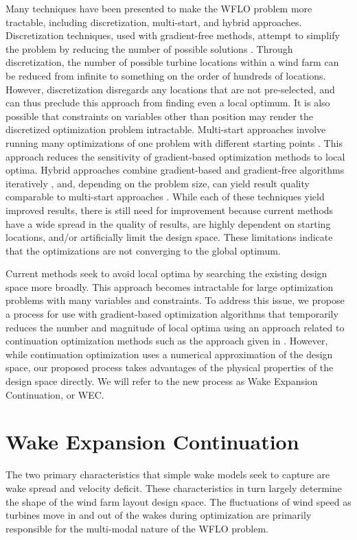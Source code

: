 \documentclass[a4paper]{jpconf}
\begin{document}
Many techniques have been presented to make the WFLO problem more tractable, including discretization, multi-start, and hybrid approaches. Discretization techniques, used with gradient-free methods, attempt to simplify the problem by reducing the number of possible solutions \cite{mosetti1994, grady2005}. Through discretization, the number of possible turbine locations within a wind farm can be reduced from infinite to something on the order of hundreds of locations. However, discretization disregards any locations that are not pre-selected, and can thus preclude this approach from finding even a local optimum. It is also possible that constraints on variables other than position may render the discretized optimization problem intractable. Multi-start approaches involve running many optimizations of one problem with different starting points \cite{gonzalez2014}. This approach reduces the sensitivity of gradient-based optimization methods to local optima. Hybrid approaches combine gradient-based and gradient-free algorithms iteratively \cite{rethore2014,graf2016, mittal2017}, and, depending on the problem size, can yield result quality comparable to multi-start approaches \cite{rethore2014}. While each of these techniques yield improved results, there is still need for improvement because current methods have a wide spread in the quality of results, are highly dependent on starting locations, and/or artificially limit the design space. These limitations indicate that the optimizations are not converging to the global optimum.

Current methods seek to avoid local optima by searching the existing design space more broadly. This approach becomes intractable for large optimization problems with many variables and constraints. To address this issue, we propose a process for use with gradient-based optimization algorithms that temporarily reduces the number and magnitude of local optima using an approach related to continuation optimization methods such as the approach given in \cite{mobahi2015}. However, while continuation optimization uses a numerical approximation of the design space, our proposed process takes advantages of the physical properties of the design space directly. We will refer to the new process as Wake Expansion Continuation, or WEC.

\section{Wake Expansion Continuation}\label{sec:dsrop}
The two primary characteristics that simple wake models seek to capture are wake spread and velocity deficit. These characteristics in turn largely determine the shape of the wind farm layout design space. The fluctuations of wind speed as turbines move in and out of the wakes during optimization are primarily responsible for the multi-modal nature of the WFLO problem. 
\end{document}
